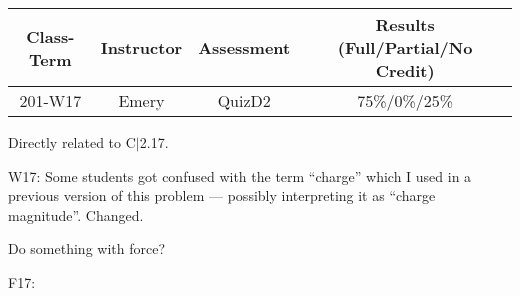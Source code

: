 \begin{outcomes}
	\begin{center}
		\begin{tabular}{cccc}
			\hline\hline
                Class-Term & Instructor & Assessment & Results (Full/Partial/No Credit) \\
			\hline
                201-W17 & Emery & QuizD2 & 75\%/0\%/25\%\\
			\hline
		\end{tabular}
	\end{center}
\end{outcomes}

\begin{comments}

Directly related to C$|$2.17.

W17: Some students got confused with the term ``charge'' which I used in a previous version of this problem --- possibly interpreting it as ``charge magnitude''. Changed.

Do something with force?

F17:
	
\end{comments}
